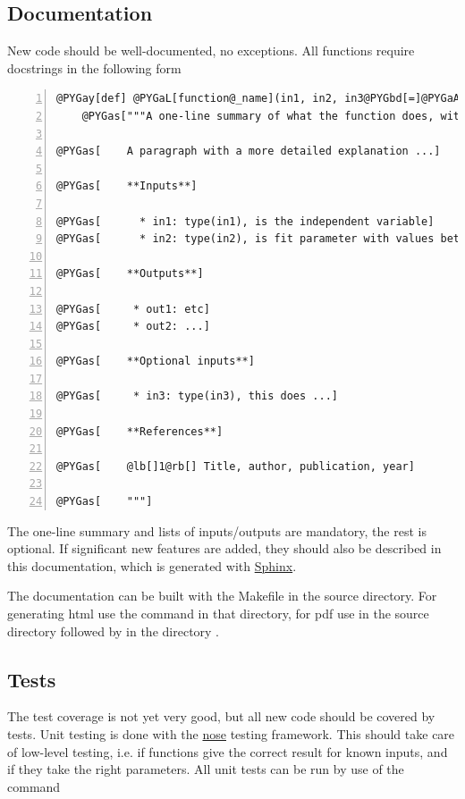 \documentclass[letterpaper,10pt,english]{manual}
\begin{document}
\subsection{Documentation}

New code should be well-documented, no exceptions. All functions require docstrings in the following form

\begin{Verbatim}[commandchars=@\[\],numbers=left,firstnumber=1,stepnumber=1]
@PYGay[def] @PYGaL[function@_name](in1, in2, in3@PYGbd[=]@PYGaA[None]):
    @PYGas["""A one-line summary of what the function does, without func name in it]

@PYGas[    A paragraph with a more detailed explanation ...]

@PYGas[    **Inputs**]

@PYGas[      * in1: type(in1), is the independent variable]
@PYGas[      * in2: type(in2), is fit parameter with values between a and b]

@PYGas[    **Outputs**]

@PYGas[     * out1: etc]
@PYGas[     * out2: ...]

@PYGas[    **Optional inputs**]

@PYGas[     * in3: type(in3), this does ...]

@PYGas[    **References**]

@PYGas[    @lb[]1@rb[] Title, author, publication, year]

@PYGas[    """]
\end{Verbatim}

The one-line summary and lists of inputs/outputs are mandatory, the rest is optional. If significant new features are added, they should also be described in this documentation, which is generated with \href{http://sphinx.pocoo.org}{Sphinx}.

The documentation can be built with the Makefile in the source directory. For generating html use the command  in that directory, for pdf use  in the source directory followed by  in the directory .


\subsection{Tests}

The test coverage is not yet very good, but all new code should be covered by tests. Unit testing is done with the \href{http://somethingaboutorange.com/mrl/projects/nose/}{nose} testing framework. This should take care of low-level testing, i.e. if functions give the correct result for known inputs, and if they take the right parameters. All unit tests can be run by use of the command
\end{document}
